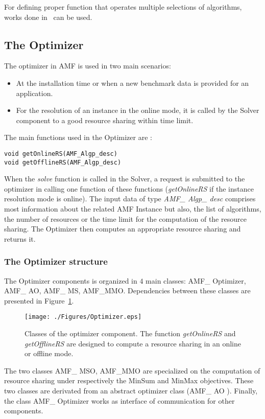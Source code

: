 For defining proper function that operates multiple selections of algorithms, works 
done in~\cite{Parco,bhowmick2006,HyperHeuristics} can be used.



\subsection{The Optimizer}

The optimizer in AMF is used in two main scenarios:
\begin{itemize}
\item At the installation time or when a new benchmark data is provided for an application.
\item For the resolution of an instance in the online mode, it is called by the Solver 
component to a good resource sharing within time limit.
\end{itemize}

The main functions used in the Optimizer are :
\begin{verbatim}
void getOnlineRS(AMF_Algp_desc)
void getOfflineRS(AMF_Algp_desc)
\end{verbatim}

When the \textit{solve} function is called in the Solver, a request is submitted to the optimizer 
in calling one function of these functions (\textit{getOnlineRS} if the instance resolution mode is online). 
The input data of type \textit{AMF\_ Algp\_ desc} comprises most information about the related  
AMF Instance but also, the list of algorithms, the number of resources or the time limit for the computation of the resource sharing. The Optimizer then computes an appropriate resource sharing 
and returns it.

\subsubsection{The Optimizer structure}

The Optimizer components is organized in $4$ main classes: AMF\_ Optimizer, AMF\_ AO, AMF\_ MS, 
AMF\_MMO. Dependencies between these classes are presented in Figure~\ref{Dependencies}. 
\begin{figure}[!htbp]
\begin{center}
\texttt{[image: ./Figures/Optimizer.eps]}
\caption{Classes of the optimizer component. The function \textit{getOnlineRS} and \textit{getOfflineRS} 
are designed to compute a resource sharing in an online or offline mode.}
 \label{Dependencies}
\end{center}
\end{figure}
The two classes AMF\_ MSO, AMF\_MMO are specialized on the computation of resource sharing 
under respectively the MinSum and MinMax objectives. These two classes are derivated from an abstract optimizer 
class (AMF\_ AO ). 
Finally, the class AMF\_ Optimizer works as interface of communication 
for other components. 


